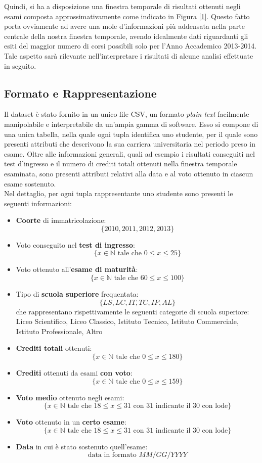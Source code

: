 Quindi, si ha a disposizione una finestra temporale di risultati ottenuti negli esami composta approssimativamente come indicato in Figura \ref{1}. Questo fatto porta ovviamente ad avere una mole d'informazioni più addensata nella parte centrale della nostra finestra temporale, avendo idealmente dati riguardanti gli esiti del maggior numero di corsi possibili solo per l'Anno Accademico 2013-2014. Tale aspetto sarà rilevante nell'interpretare i risultati di alcune analisi effettuate in seguito.

\subsection{Formato e Rappresentazione}

Il dataset è stato fornito in un unico file CSV, un formato \textit{plain text} facilmente manipolabile e interpretabile da un'ampia gamma di software. Esso si compone di una unica tabella, nella quale ogni tupla identifica uno studente, per il quale sono presenti attributi che descrivono la sua carriera universitaria nel periodo preso in esame. Oltre alle informazioni generali, quali ad esempio i risultati conseguiti nel test d'ingresso e il numero di crediti totali ottenuti nella finestra temporale esaminata, sono presenti attributi relativi alla data e al voto ottenuto in ciascun esame sostenuto. \\

Nel dettaglio, per ogni tupla rappresentante uno studente sono presenti le seguenti informazioni:

\begin{itemize}
	\item \textbf{Coorte} di immatricolazione: $$ \{2010, 2011, 2012, 2013\} $$
	\item Voto conseguito nel \textbf{test di ingresso}: $$ \{ x \in \mathbb{N} \text{ tale che } 0 \leq x \leq 25\} $$
	\item Voto ottenuto all'\textbf{esame di maturità}: $$ \{ x \in \mathbb{N} \text{ tale che } 60 \leq x \leq 100\} $$
	\item Tipo di \textbf{scuola superiore} frequentata: $$ \{LS, LC, IT, TC, IP, AL \} $$ che rappresentano rispettivamente le seguenti categorie di scuola superiore: Liceo Scientifico, Liceo Classico, Istituto Tecnico, Istituto Commerciale, Istituto Professionale, Altro
	\item \textbf{Crediti totali} ottenuti: $$ \{ x \in \mathbb{N} \text{ tale che } 0 \leq x \leq 180\} $$
	\item \textbf{Crediti} ottenuti da esami \textbf{con voto}: $$ \{ x \in \mathbb{N} \text{ tale che } 0 \leq x \leq 159\} $$
	\item \textbf{Voto medio} ottenuto negli esami: $$ \{ x \in \mathbb{N} \text{ tale che } 18 \leq x \leq 31 \text { con 31 indicante il 30 con lode}\} $$
	\item \textbf{Voto} ottenuto in un \textbf{certo esame}: $$ \{ x \in \mathbb{N} \text{ tale che } 18 \leq x \leq 31 \text { con 31 indicante il 30 con lode}\} $$
	\item \textbf{Data} in cui è stato sostenuto quell'esame: $$ \text{data in formato }MM/GG/YYYY $$
\end{itemize}

